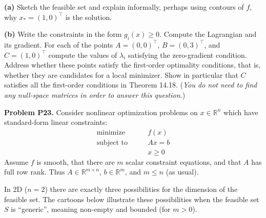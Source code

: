 \documentclass[12pt]{amsart}
\newcommand{\RR}{\mathbb{R}}
\newcommand{\prob}[1]{\bigskip\noindent\textbf{#1}\quad }
\newcommand{\epart}[1]{\medskip\noindent\textbf{(#1)}\quad }
\begin{document}
\epart{a}  Sketch the feasible set and explain informally, perhaps using contours of $f$, why $x_*=(1,0)^\top$ is the solution.

\epart{b}  Write the constraints in the form $g_i(x)\ge 0$.  Compute the Lagrangian and its gradient.  For each of the points $A = (0,0)^\top$, $B=(0,3)^\top$, and $C=(1,0)^\top$ compute the values of $\lambda_i$ satisfying the zero-gradient condition.  Address whether these points satisfy the first-order optimality conditions, that is, whether they are candidates for a local minimizer.  Show in particular that $C$ satisfies all the first-order conditions in Theorem 14.18.  (\emph{You do \emph{not} need to find any null-space matrices in order to answer this question.})


\medskip
\prob{Problem P23.}  Consider nonlinear optimization problems on $x\in \RR^n$ which have standard-form linear constraints:
    $$\begin{matrix}
    \text{minimize} \qquad & f(x) \\
    \text{subject to} \qquad & Ax = b \\
                      & x \ge 0
    \end{matrix}$$
Assume $f$ is smooth, that there are $m$ scalar constraint equations, and that $A$ has full row rank.  Thus $A\in \RR^{m\times n}$, $b\in \RR^m$, and $m\le n$ (as usual).

In 2D ($n=2$) there are exactly three possibilities for the dimension of the feasible set.  The cartoons below illustrate these possibilities when the feasible set $S$ is ``generic'', meaning non-empty and bounded (for $m>0$).

\bigskip
{}
\qquad
{}
\qquad
{}
\end{document}
